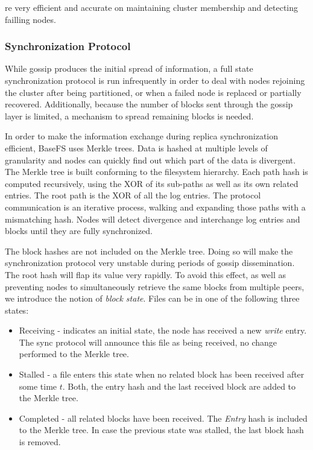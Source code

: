 \documentclass{sig-alternate}
\begin{document}
re very efficient and accurate on maintaining cluster membership and detecting failling nodes.


\subsubsection{Synchronization Protocol}

While gossip produces the initial spread of information, a full state synchronization protocol is run infrequently in order to deal with nodes rejoining the cluster after being partitioned, or when a failed node is replaced or partially recovered. Additionally, because the number of blocks sent through the gossip layer is limited, a mechanism to spread remaining blocks is needed.

In order to make the information exchange during replica synchronization efficient, BaseFS uses Merkle trees. Data is hashed at multiple levels of granularity and nodes can quickly find out which part of the data is divergent. The Merkle tree is built conforming to the filesystem hierarchy. Each path hash is computed recursively, using the XOR of its sub-paths as well as its own related entries. The root path is the XOR of all the log entries. The protocol communication is an iterative process, walking and expanding those paths with a mismatching hash. Nodes will detect divergence and interchange log entries and blocks until they are fully synchronized.

The block hashes are not included on the Merkle tree. Doing so will make the synchronization protocol very unstable during periods of gossip dissemination. The root hash will flap its value very rapidly. To avoid this effect, as well as preventing nodes to simultaneously retrieve the same blocks from multiple peers, we introduce the notion of \textit{block state}. Files can be in one of the following three states:

\begin{itemize}
\item Receiving - indicates an initial state, the node has received a new \textit{write} entry. The sync protocol will announce this file as being received, no change performed to the Merkle tree.
\item Stalled - a file enters this state when no related block has been received after some time $t$. Both, the entry hash and the last received block are added to the Merkle tree.
\item Completed - all related blocks have been received. The \textit{Entry} hash is included to the Merkle tree. In case the previous state was stalled, the last block hash is removed.
\end{itemize}
\end{document}
